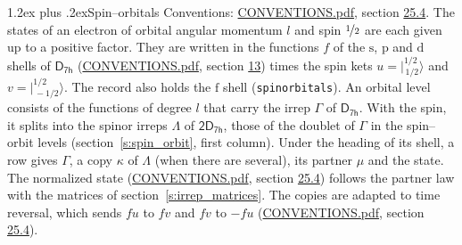 \documentclass[10pt,a4paper]{article}
\makeatletter
\renewcommand\section{\@startsection{section}{1}{\z@}{-3ex plus -1ex minus -.2ex}%
  {1.2ex plus .2ex}{\normalfont\large\sffamily\bfseries\color{parttitle}}}
\numberwithin{equation}{section}
\newcommand{\grp}[1]{\mathsf{#1}}
\newcommand{\orbital}[1]{\mathrm{#1}}
\newcommand{\mult}{\kappa}
\newcommand{\intx}{\mu}
\newcommand{\jm}[2]{\bigl\lvert{}^{#1}_{\,#2}\bigr\rangle}
\makeatother
\begin{document}
\section{Spin--orbitals}\label{s:spin_orbitals}
Conventions: \href{../../CONVENTIONS.pdf}{CONVENTIONS.pdf}, section \href{../../CONVENTIONS.pdf\#conv.25.4}{25.4}.
\leavevmode\label{n:index.orbital.l}The states of an electron of orbital angular momentum $l$ and spin $\nicefrac{1}{2}$ are each given up to a positive factor. \label{n:local.spinor.uv}\label{n:local.function.f}They are written in the functions $f$ of the $\orbital{s}$, $\orbital{p}$ and $\orbital{d}$ shells of \href{../../../rotation/data/pdf/D7h.pdf}{$\grp{D_{7h}}$} (\href{../../CONVENTIONS.pdf}{CONVENTIONS.pdf}, section \href{../../../rotation/CONVENTIONS.pdf\#conv.13}{13}) times the spin kets $u = \jm{1/2}{1/2}$ and $v = \jm{1/2}{-1/2}$. The record also holds the $\orbital{f}$ shell (\texttt{spinorbitals}). An orbital level consists of the functions of degree $l$ that carry the irrep $\Gamma$ of \href{../../../rotation/data/pdf/D7h.pdf}{$\grp{D_{7h}}$}. With the spin, it splits into the spinor irreps $\Lambda$ of $\grp{2D_{7h}}$, those of the doublet of $\Gamma$ in the spin--orbit levels (section~\ref{s:spin_orbit}, first column). \label{n:head.state}Under the heading of its shell, a row gives $\Gamma$, a copy $\mult$ of $\Lambda$ (when there are several), its partner $\intx$ and the state. The normalized state (\href{../../CONVENTIONS.pdf}{CONVENTIONS.pdf}, section \href{../../CONVENTIONS.pdf\#conv.25.4}{25.4}) follows the partner law with the matrices of section~\ref{s:irrep_matrices}. The copies are adapted to time reversal, which sends $f u$ to $f v$ and $f v$ to $-f u$ (\href{../../CONVENTIONS.pdf}{CONVENTIONS.pdf}, section \href{../../CONVENTIONS.pdf\#conv.25.4}{25.4}).
\end{document}
